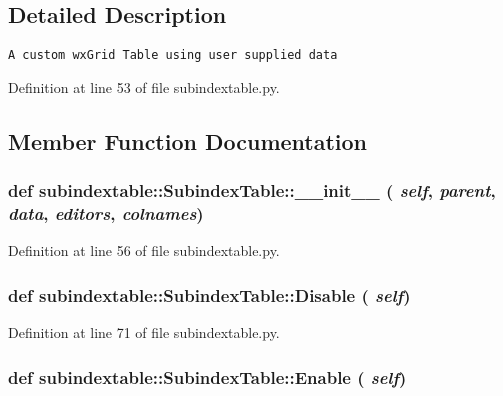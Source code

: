 \subsection{Detailed Description}


\footnotesize\begin{verbatim}
A custom wxGrid Table using user supplied data
\end{verbatim}
\normalsize
 



Definition at line 53 of file subindextable.py.

\subsection{Member Function Documentation}
\hypertarget{classsubindextable_1_1SubindexTable_217d723449d9ae8d755dd7ff0c20bc4d}{
\subsubsection[\_\-\_\-init\_\-\_\-]{\setlength{\rightskip}{0pt plus 5cm}def subindextable::Subindex\-Table::\_\-\_\-init\_\-\_\- ( {\em self},  {\em parent},  {\em data},  {\em editors},  {\em colnames})}}
\label{classsubindextable_1_1SubindexTable_217d723449d9ae8d755dd7ff0c20bc4d}




Definition at line 56 of file subindextable.py.\hypertarget{classsubindextable_1_1SubindexTable_40407a8d399c7fd09fafa1984f05cfce}{
\subsubsection[Disable]{\setlength{\rightskip}{0pt plus 5cm}def subindextable::Subindex\-Table::Disable ( {\em self})}}
\label{classsubindextable_1_1SubindexTable_40407a8d399c7fd09fafa1984f05cfce}




Definition at line 71 of file subindextable.py.\hypertarget{classsubindextable_1_1SubindexTable_f9d1c56f6df9baf4e4c6bf80d00fad8c}{
\subsubsection[Enable]{\setlength{\rightskip}{0pt plus 5cm}def subindextable::Subindex\-Table::Enable ( {\em self})}}
\label{classsubindextable_1_1SubindexTable_f9d1c56f6df9baf4e4c6bf80d00fad8c}




